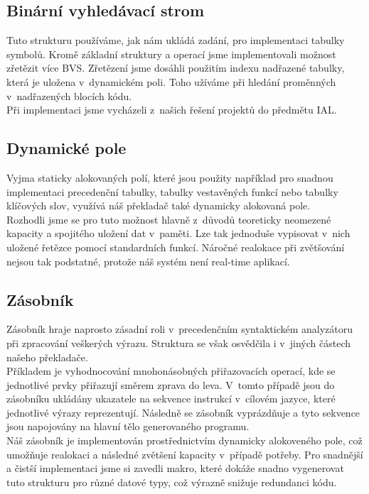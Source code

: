 \documentclass[11pt]{article}
\begin{document}
    \subsection{Binární vyhledávací strom}
        Tuto strukturu používáme, jak nám ukládá zadání, pro implementaci tabulky symbolů. Kromě základní
        struktury a operací jsme implementovali možnost zřetězit více BVS. Zřetězení jsme dosáhli
        použitím indexu nadřazené tabulky, která je uložena v~dynamickém poli. Toho užíváme
        při hledání proměnných v~nadřazených blocích kódu.\\
        \indent Při implementaci jsme vycházeli z~našich řešení projektů do předmětu IAL.
    
    \subsection{Dynamické pole}
        Vyjma staticky alokovaných polí, které jsou použity například pro snadnou implementaci precedenční tabulky,
        tabulky vestavěných funkcí nebo tabulky klíčových slov, využívá náš překladač také dynamicky
        alokovaná pole. \\
        \indent Rozhodli jsme se pro tuto možnost hlavně z~důvodů teoreticky neomezené kapacity a
        spojitého uložení dat v~paměti. Lze tak jednoduše vypisovat v~nich uložené řetězce pomocí
        standardních funkcí. Náročné realokace při zvětšování nejsou tak podstatné, protože náš systém
        není real-time aplikací.
    
    \subsection{Zásobník}
        Zásobník hraje naprosto zásadní roli v~precedenčním syntaktickém analyzátoru při zpracování
        veškerých výrazu. Struktura se však osvědčila i v~jiných částech našeho
        překladače. \\
        \indent Příkladem je vyhodnocování mnohonásobných přiřazovacích operací, kde se
        jednotlivé prvky přiřazují směrem zprava do leva. V~tomto případě jsou do zásobníku
        ukládány ukazatele na sekvence instrukcí v~cílovém jazyce, které jednotlivé výrazy
        reprezentují. Následně se zásobník vyprázdňuje a tyto sekvence jsou napojovány na hlavní tělo
        generovaného programu. \\
        \indent Náš zásobník je implementován prostřednictvím dynamicky alokoveného pole, což
        umožňuje realokaci a následné zvětšení kapacity v~případě potřeby. Pro snadnější a
        čistší implementaci jsme si zavedli makro, které dokáže snadno vygenerovat tuto
        strukturu pro různé datové typy, což výrazně snižuje redundanci kódu.
        
\end{document}
